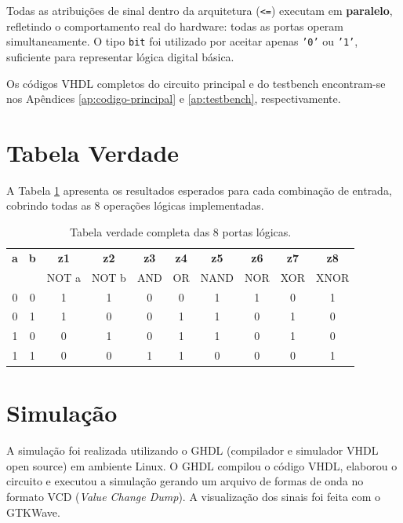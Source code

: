 \documentclass[12pt,a4paper, brazil]{article}
\begin{document}
Todas as atribuições de sinal dentro da arquitetura (\texttt{<=}) executam em \textbf{paralelo}, refletindo o comportamento real do hardware: todas as portas operam simultaneamente. O tipo \texttt{bit} foi utilizado por aceitar apenas \texttt{'0'} ou \texttt{'1'}, suficiente para representar lógica digital básica.

Os códigos VHDL completos do circuito principal e do testbench encontram-se nos Apêndices \ref{ap:codigo-principal} e \ref{ap:testbench}, respectivamente.

\section{Tabela Verdade}

A Tabela \ref{tab:verdade} apresenta os resultados esperados para cada combinação de entrada, cobrindo todas as 8 operações lógicas implementadas.

\begin{table}[H]
\centering
\caption{Tabela verdade completa das 8 portas lógicas.}
\label{tab:verdade}
\begin{tabular}{@{}cc|cccccccc@{}}
\toprule
\textbf{a} & \textbf{b} & \textbf{z1} & \textbf{z2} & \textbf{z3} & \textbf{z4} & \textbf{z5} & \textbf{z6} & \textbf{z7} & \textbf{z8} \\
           &            & NOT a & NOT b & AND & OR & NAND & NOR & XOR & XNOR \\
\midrule
0 & 0 & 1 & 1 & 0 & 0 & 1 & 1 & 0 & 1 \\
0 & 1 & 1 & 0 & 0 & 1 & 1 & 0 & 1 & 0 \\
1 & 0 & 0 & 1 & 0 & 1 & 1 & 0 & 1 & 0 \\
1 & 1 & 0 & 0 & 1 & 1 & 0 & 0 & 0 & 1 \\
\bottomrule
\end{tabular}
\end{table}
\FloatBarrier

\section{Simulação}

A simulação foi realizada utilizando o GHDL (compilador e simulador VHDL open source) em ambiente Linux. O GHDL compilou o código VHDL, elaborou o circuito e executou a simulação gerando um arquivo de formas de onda no formato VCD (\textit{Value Change Dump}). A visualização dos sinais foi feita com o GTKWave.
\end{document}

